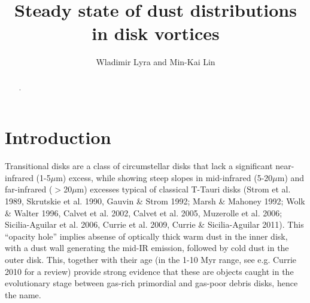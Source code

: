 \documentclass[apj]{emulateapj}
\begin{document}

\title{Steady state of dust distributions in disk vortices}
\author{Wladimir Lyra and Min-Kai Lin}

\begin{abstract}
.
\end{abstract}

\section{Introduction}
\label{sect:introduction}



Transitional disks are a class of circumstellar disks that lack a
significant near-infrared (1-5$\mu$m) excess, while showing steep
slopes in mid-infrared (5-20$\mu$m) and
far-infrared ($>$20$\mu$m) excesses typical of classical T-Tauri disks
(Strom et al. 1989, Skrutskie et al. 1990, Gauvin \& Strom 1992; Marsh
\& Mahoney 1992; Wolk \& Walter 1996, Calvet et al. 2002, Calvet et al. 2005, Muzerolle et
al. 2006; Sicilia-Aguilar et al. 2006, Currie et al. 2009, Currie \&
Sicilia-Aguilar 2011). This ``opacity hole''  implies
absense of optically thick warm dust in the inner disk, with a dust
wall generating the mid-IR emission, followed by cold dust in the
outer disk.  This, together with their age (in the 1-10 Myr range, see
e.g. Currie 2010 for a review) provide strong evidence that these are
objects caught in the evolutionary stage between gas-rich 
primordial and gas-poor debris disks, hence the name. 

\end{document}
